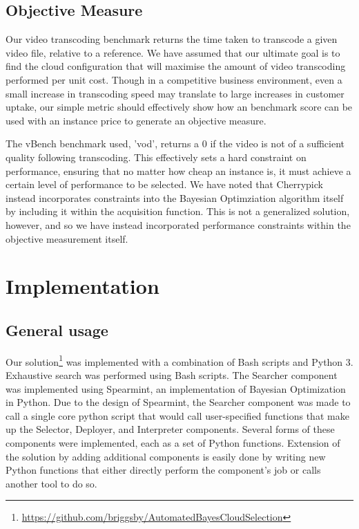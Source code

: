 \documentclass{report}
\begin{document}
\section{Objective Measure}
Our video transcoding benchmark returns the time taken to transcode a given video file, relative to a reference. We have assumed that our ultimate goal is to find the cloud configuration that will maximise the amount of video transcoding performed per unit cost. Though in a competitive business environment, even a small increase in transcoding speed may translate to large increases in customer uptake, our simple metric should effectively show how an benchmark score can be used with an instance price to generate an objective measure.

The vBench benchmark used, 'vod', returns a 0 if the video is not of a sufficient quality following transcoding. This effectively sets a hard constraint on performance, ensuring that no matter how cheap an instance is, it must achieve a certain level of performance to be selected.
We have noted that Cherrypick\cite{Alipourfard2017} instead incorporates constraints into the Bayesian Optimziation algorithm itself by including it within the acquisition function. This is not a generalized solution, however, and so we have instead incorporated performance constraints within the objective measurement itself.

\chapter{Implementation}
\section{General usage}
Our solution\footnote{\url{https://github.com/briggsby/AutomatedBayesCloudSelection}} was implemented with a combination of Bash scripts and Python 3. Exhaustive search was performed using Bash scripts. The Searcher component was implemented using Spearmint\cite{Snoek2012}, an implementation of Bayesian Optimization in Python. Due to the design of Spearmint, the Searcher component was made to call a single core python script that would call user-specified functions that make up the Selector, Deployer, and Interpreter components. Several forms of these components were implemented, each as a set of Python functions. Extension of the solution by adding additional components is easily done by writing new Python functions that either directly perform the component's job or calls another tool to do so.
\end{document}
